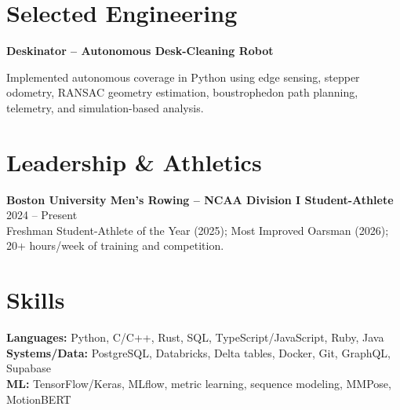 \documentclass[letterpaper,10pt]{article}
\begin{document}
\section{Selected Engineering}
\textbf{Deskinator -- Autonomous Desk-Cleaning Robot}\\[-2pt]\bi\item Implemented autonomous coverage in Python using edge sensing, stepper odometry, RANSAC geometry estimation, boustrophedon path planning, telemetry, and simulation-based analysis.\ei
\section{Leadership \& Athletics}\textbf{Boston University Men's Rowing -- NCAA Division I Student-Athlete} \hfill 2024 -- Present\\Freshman Student-Athlete of the Year (2025); Most Improved Oarsman (2026); 20+ hours/week of training and competition.
\section{Skills}\textbf{Languages:} Python, C/C++, Rust, SQL, TypeScript/JavaScript, Ruby, Java\\\textbf{Systems/Data:} PostgreSQL, Databricks, Delta tables, Docker, Git, GraphQL, Supabase\\\textbf{ML:} TensorFlow/Keras, MLflow, metric learning, sequence modeling, MMPose, MotionBERT
\end{document}
